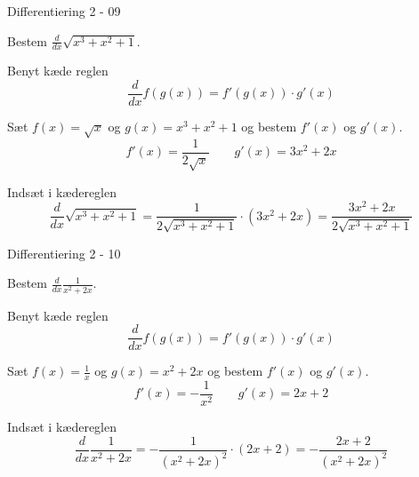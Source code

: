 \documentclass{article}
\begin{document}
\begin{exercise}{Differentiering 2 - 09}
	
	Bestem $\frac{d}{dx} \sqrt{x^3 + x^2 + 1}$.
	
	
	\hint
	Benyt kæde reglen
	\[
	\frac{d}{dx} f(g(x)) = f'(g(x)) \cdot g'(x)
	\]
	
	\hint
	Sæt $f(x) = \sqrt{x}$ og $g(x) = x^3 + x^2 + 1 $ og bestem $f'(x)$ og $g'(x)$.
	\[
	f'(x) = \frac{1}{2\sqrt{x}} \qquad g'(x) = 3x^2 + 2x
	\]
	
	\hint
	Indsæt i kædereglen
	\[
	\frac{d}{dx} \sqrt{x^3 + x^2 + 1} = \frac{1}{2 \sqrt{x^3 + x^2 + 1}} \cdot (3x^2 + 2x) = \frac{3x^2 + 2x}{2 \sqrt{x^3 + x^2 + 1}}
	\]
	
\end{exercise}

\begin{exercise}{Differentiering 2 - 10}
	
	Bestem $\frac{d}{dx} \frac{1}{x^2+2x}$.
	
	
	\hint
	Benyt kæde reglen
	\[
	\frac{d}{dx} f(g(x)) = f'(g(x)) \cdot g'(x)
	\]
	
	\hint
	Sæt $f(x) = \frac{1}{x}$ og $g(x) = x^2 + 2x$ og bestem $f'(x)$ og $g'(x)$.
	\[
	f'(x) = - \frac{1}{x^2} \qquad g'(x) = 2x + 2
	\]
	
	\hint
	Indsæt i kædereglen
	\[
	\frac{d}{dx} \frac{1}{x^2+2x} = - \frac{1}{(x^2+2x)^2} \cdot (2x + 2 ) = - \frac{2x + 2}{(x^2 + 2x)^2}
	\]
	
\end{exercise}
\end{document}

